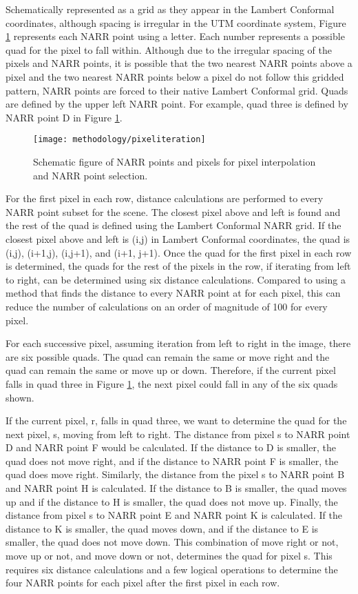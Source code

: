 \documentclass{book}
\begin{document}
Schematically represented as a grid as they appear in the Lambert Conformal coordinates, although spacing is irregular in the UTM coordinate system, Figure \ref{fig:pixeliteration} represents each NARR point using a letter.  Each number represents a possible quad for the pixel to fall within.  Although due to the irregular spacing of the pixels and NARR points, it is possible that the two nearest NARR points above a pixel and the two nearest NARR points below a pixel do not follow this gridded pattern, NARR points are forced to their native Lambert Conformal grid.  Quads are defined by the upper left NARR point.  For example, quad three is defined by NARR point D in Figure \ref{fig:pixeliteration}.

\begin{figure}[H]
\centering
\texttt{[image: methodology/pixeliteration]}
\caption{Schematic figure of NARR points and pixels for pixel interpolation and NARR point selection.}
\label{fig:pixeliteration}
\end{figure}

For the first pixel in each row, distance calculations are performed to every NARR point subset for the scene.  The closest pixel above and left is found and the rest of the quad is defined using the Lambert Conformal NARR grid.  If the closest pixel above and left is (i,j) in Lambert Conformal coordinates, the quad is (i,j), (i+1,j), (i,j+1), and (i+1, j+1).  Once the quad for the first pixel in each row is determined, the quads for the rest of the pixels in the row, if iterating from left to right, can be determined using six distance calculations.  Compared to using a method that finds the distance to every NARR point at for each pixel, this can reduce the number of calculations on an order of magnitude of 100 for every pixel.

For each successive pixel, assuming iteration from left to right in the image, there are six possible quads.  The quad can remain the same or move right and the quad can remain the same or move up or down.  Therefore, if the current pixel falls in quad three in Figure \ref{fig:pixeliteration}, the next pixel could fall in any of the six quads shown.  

If the current pixel, r,  falls in quad three, we want to determine the quad for the next pixel, s, moving from left to right.  The distance from pixel s to NARR point D and NARR point F would be calculated.  If the distance to D is smaller, the quad does not move right, and if the distance to NARR point F is smaller, the quad does move right.  Similarly, the distance from the pixel s to NARR point B and NARR point H is calculated.  If the distance to B is smaller, the quad moves up and if the distance to H is smaller, the quad does not move up.  Finally, the distance from pixel s to NARR point E and NARR point K is calculated.  If the distance to K is smaller, the quad moves down, and if the distance to E is smaller, the quad does not move down.  This combination of move right or not, move up or not, and move down or not, determines the quad for pixel s.  This requires six distance calculations and a few logical operations to determine the four NARR points for each pixel after the first pixel in each row.
\end{document}
